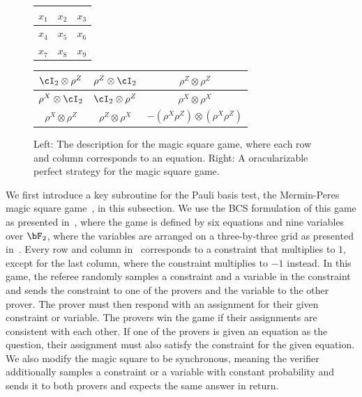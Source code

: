\begin{figure}[!b]
	\begin{center}
		\begin{tabular}{|c|c|c|}
			\hline
			$x_1$ & $x_2$ & $x_3$ \\
			\hline 
			$x_4$ & $x_5$ & $x_6$ \\
			\hline
			$x_7$ & $x_8$ & $x_9$ \\
			\hline
		\end{tabular} 		\qquad
		\begin{tabular}{|c|c|c|}
			\hline
			$\cI_2 \otimes \rho^{Z}$ & $\rho^{Z} \otimes \cI_2$ & $\rho^{Z} \otimes \rho^{Z}$ \\
			\hline 
			$\rho^{X} \otimes \cI_2$ & $\cI_2 \otimes \rho^{Z}$ & $\rho^{X} \otimes \rho^{X}$ \\
			\hline
			$\rho^{X} \otimes \rho^{Z}$ & 	$\rho^{Z} \otimes \rho^{X}$ & $ - \left(\rho^{X}  \rho^{Z} \right) \otimes  \left(\rho^{X}  \rho^{Z} \right)$ \\
			\hline
		\end{tabular}
		
	\end{center}
	\caption{Left: The description for the magic square game, where each row and column corresponds to an equation. Right: A oracularizable perfect strategy for the magic square game.}
	\label{fig:magicsquare}
\end{figure}
We first introduce a key subroutine for the Pauli basis test, the Mermin-Peres magic square game~\cite{merminSimpleUnifiedForm1990, peresIncompatibleResultsQuantum1990}, in this subsection. We use the BCS formulation of this game as presented in~\cite{cleveCharacterizationBinaryConstraint2014}, where the game is defined by six equations and nine variables over $\bF_2$, where the variables are arranged on a three-by-three grid as presented in~. Every row and column in~ corresponds to a constraint that multiplies to $1$, except for the last column, where the constraint multiplies to $-1$ instead. In this game, the referee randomly samples a constraint and a variable in the constraint and sends the constraint to one of the provers and the variable to the other prover. The prover must then respond with an assignment for their given constraint or variable. The provers win the game if their assignments are consistent with each other. If one of the provers is given an equation as the question, their assignment must also satisfy the constraint for the given equation. We also modify the magic square to be synchronous, meaning the verifier additionally samples a constraint or a variable with constant probability and sends it to both provers and expects the same answer in return.


